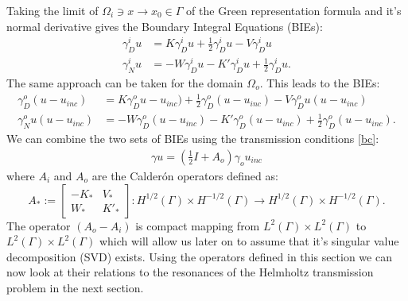 \documentclass[a4paper, oneside]{thirdparty_stylesheets/discothesis}
\begin{document}
Taking the limit of $\Omega_i \ni x \rightarrow x_0 \in \Gamma$ of the Green representation formula and it's normal derivative gives the Boundary Integral Equations (BIEs):
\begin{align}
	\gamma_D^iu &= K\gamma_D^iu + \frac{1}{2}\gamma_D^iu - V\gamma_D^iu \\
	\gamma_N^iu &= -W\gamma_D^iu - K'\gamma_D^iu + \frac{1}{2}\gamma_D^iu.
\end{align}
The same approach can be taken for the domain $\Omega_o$.
This leads to the BIEs:
\begin{align}
	\gamma_D^o(u-u_{inc}) &= K\gamma_D^ou-u_{inc}) + \frac{1}{2}\gamma_D^o(u-u_{inc}) - V\gamma_D^ou(u-u_{inc}) \\
	\gamma_N^ou(u-u_{inc}) &= -W\gamma_D^o(u-u_{inc}) - K'\gamma_D^o(u-u_{inc}) + \frac{1}{2}\gamma_D^o(u-u_{inc}).
\end{align}
We can combine the two sets of BIEs using the transmission conditions \ref{bc}:
\begin{align}
	[I + (A_o-A_i)] \gamma u = (\frac{1}{2}I + A_o)\gamma_o u_{inc} \label{BIE}
\end{align}
where $A_i$ and $A_o$ are the Calderón operators defined as:
\begin{equation}
	A_* :=
	\begin{bmatrix}
		-K_* & V_* \\
		W_* & K'_*
	\end{bmatrix}
	: H^{1/2}(\Gamma)\times H^{-1/2}(\Gamma) \longrightarrow H^{1/2}(\Gamma)\times H^{-1/2}(\Gamma). \label{BIEtot}
\end{equation}
The operator $(A_o-A_i)$ is compact mapping from $L^2(\Gamma)\times L^2(\Gamma)$ to $L^2(\Gamma)\times L^2(\Gamma)$ which will allow us later on to assume that it's singular value decomposition (SVD) exists.
Using the operators defined in this section we can now look at their relations to the resonances of the Helmholtz transmission problem in the next section.
\end{document}
